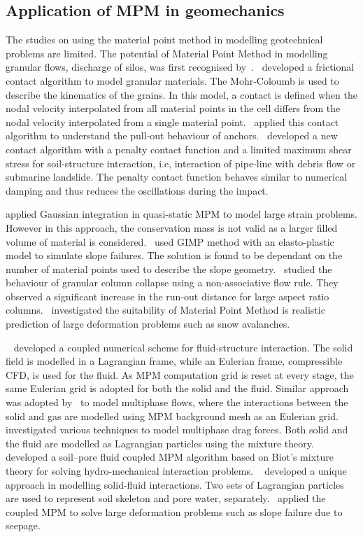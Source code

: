 \subsection{Application of MPM in geomechanics}

The studies on using the material point method in modelling
geotechnical problems are limited. The potential of Material Point Method in 
modelling granular flows, discharge of silos, was first recognised 
by~\citet{Wieckowski1999}.~\citet{Bardenhagen2001} developed a frictional 
contact algorithm to model granular materials. The Mohr-Coloumb is used to 
describe the kinematics of the grains. In this model, a contact is defined when 
the nodal velocity interpolated from all material points in the cell differs 
from the nodal velocity interpolated from a single material 
point.~\citet{Coetzee2005} applied this contact algorithm to understand the 
pull-out behaviour of anchors.~\citet{Ma2014} developed a new contact algorithm 
with a penalty contact function and a limited maximum shear stress for 
soil-structure interaction, i.e, interaction of pipe-line with debris flow or 
submarine landslide. The penalty contact function behaves similar to numerical 
damping and thus reduces the oscillations during the impact. 

\citet{Beuth2010} applied Gaussian integration in quasi-static MPM to model 
large strain problems. However in this approach, the conservation mass is not 
valid as a larger filled volume of material is considered.~\citet{Andersen2010} 
used GIMP method with an elasto-plastic model to simulate slope failures. The 
solution is found to be dependant on the number of material points used to 
describe the slope geometry.~\citet{Mast2014} studied the behaviour of granular 
column collapse using a non-associative flow rule. They observed a 
significant increase in the run-out distance for large aspect ratio 
columns.~\citet{Mast2014a} investigated the suitability of Material Point 
Method is realistic prediction of large deformation problems such as snow 
avalanches. 

~\citet{Guilkey2007} developed a coupled numerical scheme for fluid-structure 
interaction. The solid field is modelled in a Lagrangian frame, while an 
Eulerian frame, compressible CFD, is used for the fluid. As MPM computation 
grid is reset at every stage, the same Eulerian grid is adopted for both the 
solid and the fluid. Similar approach was adopted by~\cite{Zhang2008} to model 
multiphase flows, where the interactions between the solid and gas are modelled 
using MPM background mesh as an Eulerian 
grid.~\citet{Mackenzie-Helnwein2010} investigated various techniques to model 
multiphase drag forces. Both solid and the fluid are modelled as Lagrangian 
particles using the mixture theory.~\citet{Abe2013} developed a soil–pore fluid 
coupled MPM algorithm based on Biot’s mixture theory for solving 
hydro-mechanical interaction problems. ~\citet{Bandara2013} developed a unique 
approach in modelling solid-fluid interactions. Two sets of Lagrangian 
particles are used to represent soil skeleton and pore water, 
separately.~\citet{Bandara2013} applied the coupled MPM to solve large 
deformation problems such as slope failure due to seepage.

